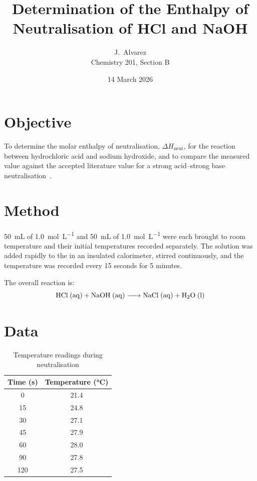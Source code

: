 \documentclass[a4paper,11pt]{article}
\title{Determination of the Enthalpy of Neutralisation of HCl and NaOH}
\author{J.\ Alvarez \\ Chemistry 201, Section B}
\date{14 March 2026}
\begin{document}
\maketitle

\section*{Objective}

To determine the molar enthalpy of neutralisation, $\Delta H_\text{neut}$, for
the reaction between hydrochloric acid and sodium hydroxide, and to compare
the measured value against the accepted literature value for a strong
acid--strong base neutralisation~\cite{atkins2018}.

\section*{Method}

\SI{50}{\milli\liter} of \SI{1.0}{\mole\per\liter}  and
\SI{50}{\milli\liter} of \SI{1.0}{\mole\per\liter}  were each
brought to room temperature and their initial temperatures recorded
separately. The  solution was added rapidly to the  in an
insulated calorimeter, stirred continuously, and the temperature was
recorded every 15 seconds for 5 minutes.

The overall reaction is:
\begin{equation}
  \ce{HCl (aq) + NaOH (aq) -> NaCl (aq) + H2O (l)}
\end{equation}

\section*{Data}

\begin{table}[h]
  \centering
  \caption{Temperature readings during neutralisation}
  \begin{tabular}{S[table-format=2.0] S[table-format=2.1]}
    \toprule
    {Time (s)} & {Temperature (\si{\celsius})} \\
       & 21.4 \\
    15  & 24.8 \\
    30  & 27.1 \\
    45  & 27.9 \\
    60  & 28.0 \\
    90  & 27.8 \\
    120 & 27.5 \\
    \bottomrule
  \end{tabular}
\end{table}
\end{document}
